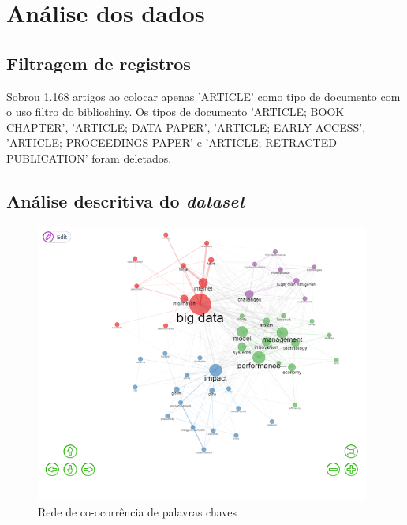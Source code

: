 \section{Análise dos dados}

\subsection{Filtragem de registros}

Sobrou 1.168 artigos ao colocar apenas 'ARTICLE' como tipo de documento com o uso filtro do biblioshiny. Os tipos de documento 'ARTICLE; BOOK CHAPTER', 'ARTICLE; DATA PAPER', 'ARTICLE; EARLY ACCESS', 'ARTICLE; PROCEEDINGS PAPER' e 'ARTICLE; RETRACTED PUBLICATION' foram deletados.


\subsection{Análise descritiva do \textit{dataset}} 


\begin{figure}[ht]
    \centering
    \includegraphics[width=11cm]{experiments/Tong00020/PesquisaBibliometrica/Conceptual Structure/MASSA@Tong00020-Co-occurrence Network}
    \caption{Rede de co-ocorrência de palavras chaves}
    \label{fig:rede}
\end{figure}


